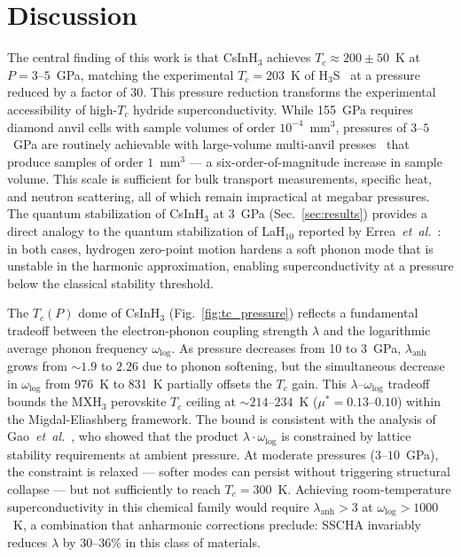 \section{Discussion}
\label{sec:discussion}


The central finding of this work is that CsInH$_3$ achieves
$T_c \approx 200 \pm 50$~K at $P = 3$--$5$~GPa, matching the
experimental $T_c = 203$~K of H$_3$S~\cite{Drozdov2015} at a pressure
reduced by a factor of $30$. This pressure reduction transforms the
experimental accessibility of high-$T_c$ hydride superconductivity.
While 155~GPa requires diamond anvil cells with sample volumes of order
$10^{-4}$~mm$^3$, pressures of $3$--$5$~GPa are routinely achievable
with large-volume multi-anvil presses~\cite{walker1999}
that produce samples of order $1$~mm$^3$ --- a six-order-of-magnitude
increase in sample volume. This scale is sufficient for bulk transport
measurements, specific heat, and neutron scattering, all of which remain
impractical at megabar pressures. The quantum stabilization of CsInH$_3$
at 3~GPa (Sec.~\ref{sec:results}) provides a direct analogy to the
quantum stabilization of LaH$_{10}$ reported by
Errea~\textit{et~al.}~\cite{Errea2020}: in both cases, hydrogen
zero-point motion hardens a soft phonon mode that is unstable in the
harmonic approximation, enabling superconductivity at a pressure below
the classical stability threshold.


The $T_c(P)$ dome of CsInH$_3$ (Fig.~\ref{fig:tc_pressure}) reflects a
fundamental tradeoff between the electron-phonon coupling strength
$\lambda$ and the logarithmic average phonon frequency
$\omega_{\mathrm{log}}$. As pressure decreases from 10 to 3~GPa,
$\lambda_{\mathrm{anh}}$ grows from $\sim 1.9$ to $2.26$ due to phonon
softening, but the simultaneous decrease in $\omega_{\mathrm{log}}$ from
976~K to 831~K partially offsets the $T_c$ gain. This
$\lambda$--$\omega_{\mathrm{log}}$ tradeoff bounds the MXH$_3$
perovskite $T_c$ ceiling at $\sim 214$--$234$~K ($\mu^* = 0.13$--$0.10$)
within the Migdal-Eliashberg framework. The bound is consistent with the
analysis of Gao~\textit{et~al.}~\cite{gao2025ceiling}, who
showed that the product $\lambda \cdot \omega_{\mathrm{log}}$ is
constrained by lattice stability requirements at ambient pressure. At
moderate pressures ($3$--$10$~GPa), the constraint is relaxed --- softer
modes can persist without triggering structural collapse --- but not
sufficiently to reach $T_c = 300$~K. Achieving room-temperature
superconductivity in this chemical family would require
$\lambda_{\mathrm{anh}} > 3$ at $\omega_{\mathrm{log}} > 1000$~K, a
combination that anharmonic corrections preclude: SSCHA invariably
reduces $\lambda$ by $30$--$36\%$ in this class of materials.

